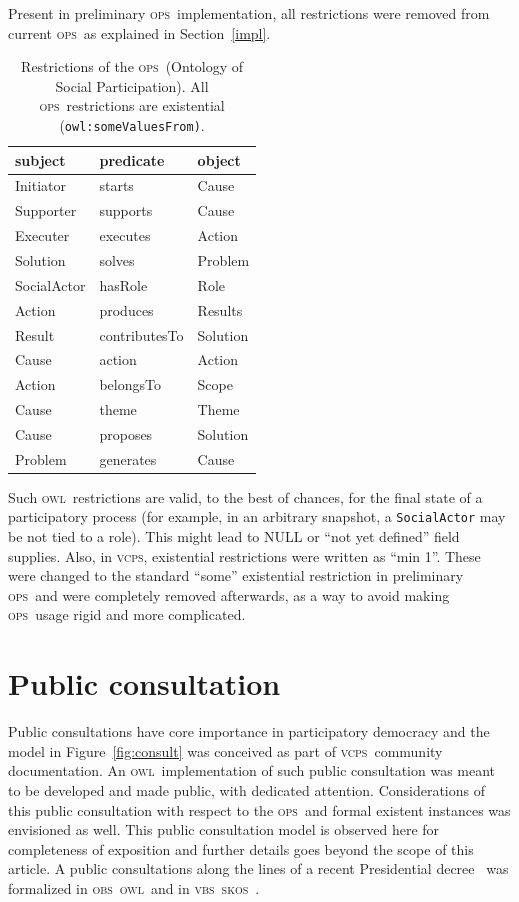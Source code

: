 \documentclass[10pt,letterpaper]{article}
\newcommand{\ops}{\textsc{ops}}
\newcommand{\vcps}{\textsc{vcps}}
\newcommand{\owl}{\textsc{owl}}
\newcommand{\skos}{\textsc{skos}}
\newcommand{\obs}{\textsc{obs}}
\newcommand{\vbs}{\textsc{vbs}}
\begin{document}
Present in preliminary \ops\ implementation, all restrictions were removed from current \ops\ as explained in Section~\ref{impl}.
\begin{table}[!h]
  \centering
  \caption{Restrictions of the \ops\ (Ontology of Social Participation). All \ops\ restrictions are existential (\texttt{owl:someValuesFrom)}.}
  \begin{tabular}{|l|l|l|}\hline
{\bf subject} & {\bf predicate} & {\bf object} \\\hline\hline
Initiator    & starts        & Cause\\\hline
Supporter    & supports      & Cause\\\hline
Executer     & executes     & Action\\\hline
Solution     & solves      & Problem\\\hline
SocialActor  & hasRole            & Role\\\hline
Action       & produces    & Results\\\hline
Result       & contributesTo   & Solution\\\hline
Cause        & action          & Action\\\hline
Action       & belongsTo     & Scope\\\hline
Cause        & theme           & Theme\\\hline
Cause        & proposes   & Solution\\\hline
Problem      & generates     & Cause\\\hline
  \end{tabular}
  \label{ospRestr}
\end{table}

Such \owl\ restrictions are valid, to the best of chances, for the final state of a participatory process (for example, in an arbitrary snapshot, a \texttt{SocialActor} may be not tied to a role). This might lead to NULL or ``not yet defined'' field supplies.
Also, in \vcps, existential restrictions were  written as ``min 1''. 
These were changed to the standard ``some'' existential restriction in preliminary \ops\ and were completely removed afterwards, as a way to avoid making \ops\ usage rigid and more complicated.



\section{Public consultation}\label{ap:public}
Public consultations have core importance in participatory democracy and the model in Figure~\ref{fig:consult} was conceived as part of \vcps\ community documentation.
An \owl\ implementation of such public consultation was meant to be developed and made public, with dedicated attention.
Considerations of this public consultation with respect to the \ops\ and formal existent instances was envisioned as well.
This public consultation model is observed here for completeness of exposition and further details goes beyond the scope of this article. A public consultations along the lines of a recent Presidential decree~\cite{decree} was formalized in \obs\ \owl\ and in \vbs\ \skos~\cite{pnud5}.
\end{document}
